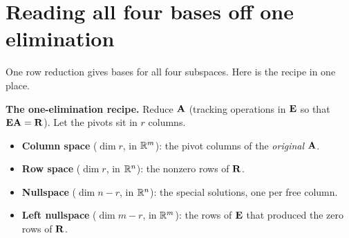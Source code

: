 \section{Reading all four bases off one elimination}

One row reduction gives bases for all four subspaces. Here is the recipe in one place.

\begin{formalbox}
\textbf{The one-elimination recipe.} Reduce $\mathbf{A}$ (tracking operations in $\mathbf{E}$ so that
$\mathbf{E}\mathbf{A}=\mathbf{R}$). Let the pivots sit in $r$ columns.
\begin{itemize}
  \item \textbf{Column space} ($\dim r$, in $\mathbb{R}^m$): the pivot columns of the \emph{original}
  $\mathbf{A}$.
  \item \textbf{Row space} ($\dim r$, in $\mathbb{R}^n$): the nonzero rows of $\mathbf{R}$.
  \item \textbf{Nullspace} ($\dim n-r$, in $\mathbb{R}^n$): the special solutions, one per free column.
  \item \textbf{Left nullspace} ($\dim m-r$, in $\mathbb{R}^m$): the rows of $\mathbf{E}$ that produced the
  zero rows of $\mathbf{R}$.
\end{itemize}
\end{formalbox}

